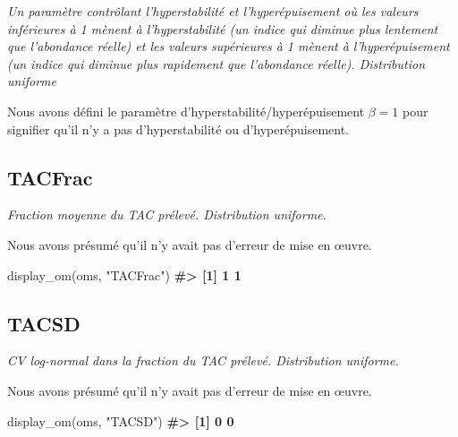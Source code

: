 \documentclass[french,11pt]{book}
\newenvironment{Shaded}{\begin{snugshade}}{\end{snugshade}}
\newcommand{\CommentTok}[1]{\textcolor[rgb]{0.56,0.35,0.01}{\textbf{#1}}}
\newcommand{\FunctionTok}[1]{\textcolor[rgb]{0.00,0.00,0.00}{#1}}
\newcommand{\NormalTok}[1]{#1}
\newcommand{\StringTok}[1]{\textcolor[rgb]{0.31,0.60,0.02}{#1}}
\begin{document}
\emph{Un paramètre contrôlant l'hyperstabilité et l'hyperépuisement où les valeurs inférieures à 1 mènent à l'hyperstabilité (un indice qui diminue plus lentement que l'abondance réelle) et les valeurs supérieures à 1 mènent à l'hyperépuisement (un indice qui diminue plus rapidement que l'abondance réelle). Distribution uniforme}

Nous avons défini le paramètre d'hyperstabilité/hyperépuisement \(\beta = 1\) pour signifier qu'il n'y a pas d'hyperstabilité ou d'hyperépuisement.

\label{app:desc-imp-yelloweye}

\subsection{TACFrac}
\label{app:desc-imp-tacfrac-yelloweye}

\emph{Fraction moyenne du TAC prélevé. Distribution uniforme.}

Nous avons présumé qu'il n'y avait pas d'erreur de mise en œuvre.
\begin{Shaded}
\begin{Highlighting}[]
\FunctionTok{display\_om}\NormalTok{(oms, }\StringTok{"TACFrac"}\NormalTok{)}
\CommentTok{\#\textgreater{} [1] 1 1}
\end{Highlighting}
\end{Shaded}
\subsection{TACSD}
\label{app:desc-imp-tacsd-yelloweye}

\emph{CV log-normal dans la fraction du TAC prélevé. Distribution uniforme.}

Nous avons présumé qu'il n'y avait pas d'erreur de mise en œuvre.
\begin{Shaded}
\begin{Highlighting}[]
\FunctionTok{display\_om}\NormalTok{(oms, }\StringTok{"TACSD"}\NormalTok{)}
\CommentTok{\#\textgreater{} [1] 0 0}
\end{Highlighting}
\end{Shaded}
\newpage


\clearpage

\label{app:mps}
\end{document}
